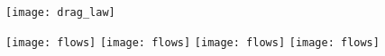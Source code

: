 \documentclass[border=3.141592, preview]{standalone}
\begin{document}
\begin{figure}
    \vspace*{-.8cm}
    \begin{center}
        \texttt{[image: drag\_law]}\\
    \end{center}
    \vspace{-4.5cm}
    \hspace{1.80cm}\texttt{[image: flows]}
    \hspace{0.82cm}\texttt{[image: flows]}
    \hspace{1.30cm}\texttt{[image: flows]}
    \hspace{1.30cm}\texttt{[image: flows]}
    \vspace{3.5cm}
\end{figure}
\end{document}
